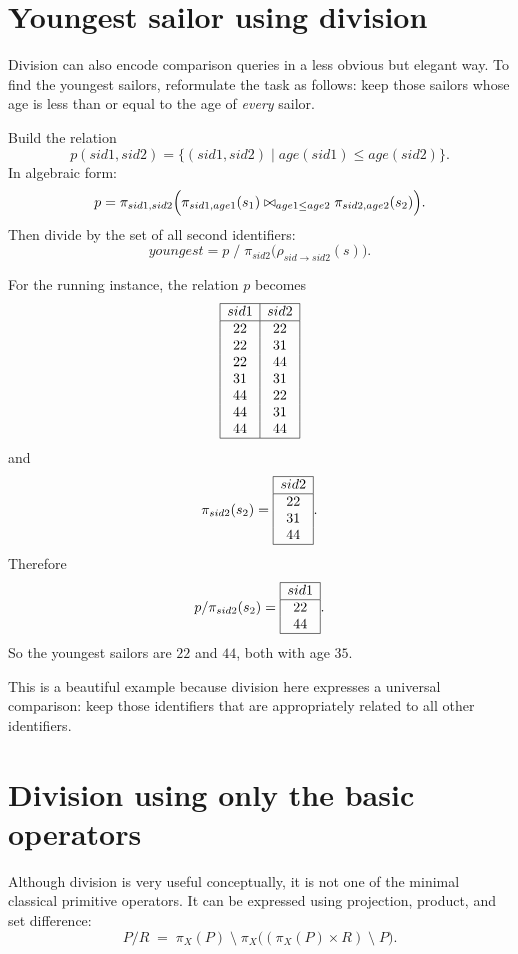 \documentclass[11pt,a4paper,openany]{book}
\newcommand{\RAproject}{\pi}
\newcommand{\RArename}{\rho}
\newcommand{\join}{\bowtie}
\begin{document}
\section{Youngest sailor using division}
Division can also encode comparison queries in a less obvious but elegant way. To find the youngest sailors, reformulate the task as follows: keep those sailors whose age is less than or equal to the age of \emph{every} sailor.

Build the relation
\[
p(sid1,sid2)=\{(sid1,sid2)\mid age(sid1)\le age(sid2)\}.
\]
In algebraic form:
\[
p=\RAproject_{sid1,sid2}\Bigl(
\RAproject_{sid1,age1}(s_1)
\join_{age1\le age2}
\RAproject_{sid2,age2}(s_2)
\Bigr).
\]
Then divide by the set of all second identifiers:
\[
youngest = p\;/\;\RAproject_{sid2}\bigl(\RArename_{sid\rightarrow sid2}(s)\bigr).
\]

For the running instance, the relation \(p\) becomes
\[
\begin{array}{|c|c|}\hline
sid1&sid2\\\hline
22&22\\
22&31\\
22&44\\
31&31\\
44&22\\
44&31\\
44&44\\\hline
\end{array}
\]
and
\[
\RAproject_{sid2}(s_2)=
\begin{array}{|c|}\hline sid2\\\hline 22\\31\\44\\\hline\end{array}.
\]
Therefore
\[
p/\RAproject_{sid2}(s_2)=
\begin{array}{|c|}\hline sid1\\\hline 22\\44\\\hline\end{array}.
\]
So the youngest sailors are \(22\) and \(44\), both with age \(35\).

This is a beautiful example because division here expresses a universal comparison: keep those identifiers that are appropriately related to all other identifiers.

\section{Division using only the basic operators}
Although division is very useful conceptually, it is not one of the minimal classical primitive operators. It can be expressed using projection, product, and set difference:
\[
P / R \;=\; \RAproject_X(P)\; \setminus\; \RAproject_X\bigl( (\RAproject_X(P)\times R)\; \setminus\; P \bigr).
\]
\end{document}
